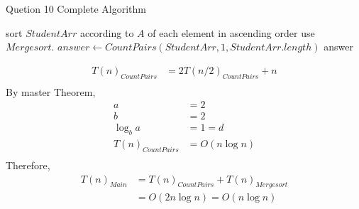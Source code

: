 \documentclass[10.5pt]{article}
\begin{document}
\begin{algorithm} [H]
	\caption{Quetion 10 Complete Algorithm}
	\begin{algorithmic} [1]
		\State sort $StudentArr$ according to $A$ of each element in ascending order use $Mergesort$.
		\State $answer \gets CountPairs(StudentArr, 1, StudentArr.length)$
		\State \Return answer
		\EndFunction
	\end{algorithmic}
\end{algorithm}

\begin{align*}
	T(n)_{CountPairs} &= 2T(n/2)_{CountPairs} + n \\
\end{align*}
By master Theorem, 
\begin{align*}
	a & = 2\\
	b & = 2\\
	\log_b a & = 1 = d\\
	T(n)_{CountPairs}& = O(n\log n)\\
\end{align*}
Therefore, 
\begin{align*}
	T(n)_{Main} &= T(n)_{CountPairs} + T(n)_{Mergesort} \\
							&= O(2n\log n) = O(n\log n)
\end{align*}
\newpage
\end{document}
